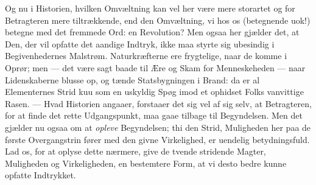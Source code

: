 \documentclass[12pt,a4paper]{book}
\begin{document}
Og nu i Historien, hvilken Omvæltning kan vel her være mere storartet og for
Betragteren mere tiltrækkende, end den Omvæltning, vi hos os (betegnende uok!)
betegne med det fremmede Ord: en Revolution? Men ogsaa her gjælder det, at Den,
der vil opfatte det aandige Indtryk, ikke maa styrte sig ubesindig i
Begivenhedernes Malstrøm. Naturkræfterne ere frygtelige, naar de komme i Oprør;
men --- det være sagt baade til Ære og Skam for Menneskeheden --- naar
Lidenskaberne blusse op, og tænde Statsbygningen i Brand: da er al Elementernes
Strid kuu som en uskyldig Spøg imod et ophidset Folks vanvittige Rasen.
--- Hvad Historien angaaer, forstaaer det sig vel af sig selv, at Betragteren,
for at finde det rette Udgangspunkt, maa gaae tilbage til Begyndelsen. Men det
gjælder nu ogsaa om at \emph{opleve} Begyndelsen; thi den Strid, Muligheden her
paa de første Overgangstrin fører med den givne Virkelighed, er uendelig
betydningsfuld. Lad os, for at oplyse dette nærmere, give de tvende stridende
Magter, Muligheden og Virkeligheden, en bestemtere Form, at vi desto bedre kunne
opfatte Indtrykket.
\end{document}

